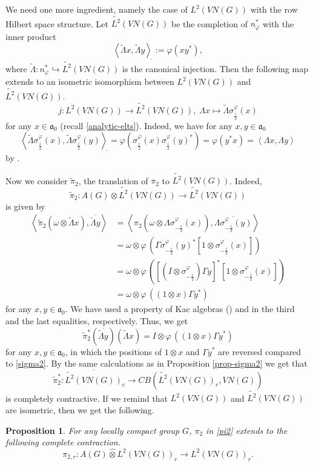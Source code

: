 \documentclass[10pt]{amsart}
\newtheorem{prop}[thm]{Proposition}
\numberwithin{thm}{section}
\numberwithin{equation}{section}
\begin{document}
We need one more ingredient, namely the case of $L^2(VN(G))$ with the row Hilbert space structure.
Let $\widetilde{L^2}(VN(G))$ be the completion of $n^*_\varphi$ with the inner product
	$$\left\langle \widetilde{\Lambda} x, \widetilde{\Lambda} y \right\rangle_{\widetilde{}} := \varphi(xy^*),$$
where $\widetilde{\Lambda} : n^*_\varphi \hookrightarrow \widetilde{L^2}(VN(G))$ is the canonical injection.
Then the following map extends to an isometric isomorphism between $L^2(VN(G))$ and $\widetilde{L^2}(VN(G))$.
	$$j : L^2(VN(G)) \rightarrow \widetilde{L^2}(VN(G)), \; \Lambda x \mapsto \widetilde{\Lambda} \sigma^\varphi_{\frac{i}{2}}(x)$$
for any $x\in \mathfrak{a}_0$ (recall \eqref{analytic-elts}).
Indeed, we have for any $x, y\in \mathfrak{a}_0$
	$$\left\langle \widetilde{\Lambda} \sigma^\varphi_{\frac{i}{2}}(x), \widetilde{\Lambda} \sigma^\varphi_{\frac{i}{2}}(y) \right\rangle_{\widetilde{}}
	= \varphi(\sigma^\varphi_{\frac{i}{2}}(x) \sigma^\varphi_{\frac{i}{2}}(y)^*) = \varphi(y^* x) = \left\langle \Lambda x, \Lambda y \right\rangle$$
by \cite[Lem 3.18]{Ta03}.

Now we consider $\widetilde{\pi}_2$, the translation of $\pi_2$ to $\widetilde{L^2}(VN(G))$. Indeed,
	$$\widetilde{\pi}_2 : A(G) \otimes \widetilde{L^2}(VN(G)) \rightarrow \widetilde{L^2}(VN(G))$$
is given by
	\begin{align*}
	\left\langle \widetilde{\pi}_2 ({\omega} \otimes \widetilde{\Lambda} x), \overline{\widetilde{\Lambda} y} \right\rangle
	& = \left\langle \pi_2 ({\omega} \otimes \Lambda \sigma^\varphi_{-\frac{i}{2}}(x)), \overline{\Lambda \sigma^\varphi_{-\frac{i}{2}}(y)} \right\rangle\\
	& = {\omega} \otimes \varphi\, (\Gamma \sigma^\varphi_{-\frac{i}{2}}(y)^*[1 \otimes \sigma^\varphi_{-\frac{i}{2}}(x)])\\
	& = {\omega} \otimes \varphi\, ([(I\otimes \sigma^\varphi_{-\frac{i}{2}})\Gamma y]^*[1\otimes \sigma^\varphi_{-\frac{i}{2}}(x)])\\
	& = {\omega} \otimes \varphi\, ((1\otimes x)\Gamma y^*)
	\end{align*}
for any $x, y\in \mathfrak{a}_0$. We have used a property of Kac algebras (\cite[Corollary 2.5.7]{ES92}) and \cite[Lem 3.18]{Ta03}
in the third and the last equalities, respectively.
Thus, we get
	$$\widetilde{\pi}^*_2(\overline{\widetilde{\Lambda} y})(\widetilde{\Lambda} x) = I\otimes \varphi\, ((1\otimes x)\Gamma y^*)$$
for any $x, y\in \mathfrak{a}_0$, in which the positions of $1\otimes x$ and $\Gamma y^*$ are reversed compared to \eqref{sigma2}.
By the same calculations as in Proposition \ref{prop-sigma2} we get that
	$$\widetilde{\pi}^*_2 : \overline{\widetilde{L^2}(VN(G))}_c \rightarrow CB(\widetilde{L^2}(VN(G))_r, VN(G))$$
is completely contractive.
If we remind that $L^2(VN(G))$ and $\widetilde{L^2}(VN(G))$ are isometric, then we get the following.
	\begin{prop}
	For any locally compact group $G$, $\pi_2$ in \eqref{pi2} extends to the following complete contraction.
		$$\pi_{2,r} : A(G) {\widehat{\otimes}} L^2(VN(G))_r \rightarrow L^2(VN(G))_r.$$
	\end{prop}
\end{document}
